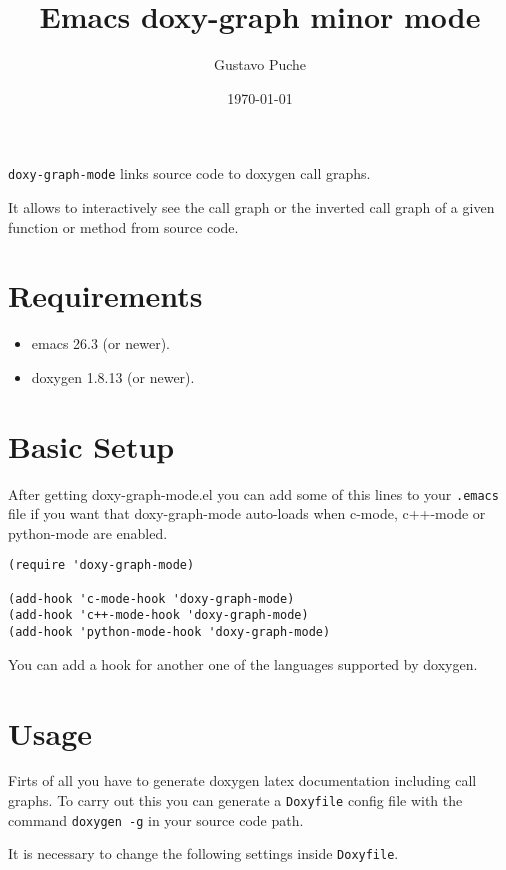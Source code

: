 \documentclass[11pt]{article}
\author{Gustavo Puche}
\date{\today}
\title{Emacs doxy-graph minor mode}
\begin{document}
\maketitle
\tableofcontents

\texttt{doxy-graph-mode} links source code to doxygen call graphs.

It allows to interactively see the call graph or the inverted call
graph of a given function or method from source code.

\section{Requirements}
\label{sec:orge533f33}

\begin{itemize}
\item emacs 26.3 (or newer).
\item doxygen 1.8.13 (or newer).
\end{itemize}

\section{Basic Setup}
\label{sec:org3e8d4e1}

After getting doxy-graph-mode.el you can add some of this lines to your \texttt{.emacs} file
if you want that doxy-graph-mode auto-loads when c-mode, c++-mode or python-mode are enabled.

\begin{verbatim}
(require 'doxy-graph-mode)

(add-hook 'c-mode-hook 'doxy-graph-mode)
(add-hook 'c++-mode-hook 'doxy-graph-mode)
(add-hook 'python-mode-hook 'doxy-graph-mode)
\end{verbatim}

You can add a hook for another one of the languages supported by doxygen.

\section{Usage}
\label{sec:orgbaf6fa3}

Firts of all you have to generate doxygen latex documentation
including call graphs. To carry out this you can generate a \texttt{Doxyfile}
config file with the command \texttt{doxygen -g} in your source code path.

It is necessary to change the following settings inside \texttt{Doxyfile}.
\end{document}
